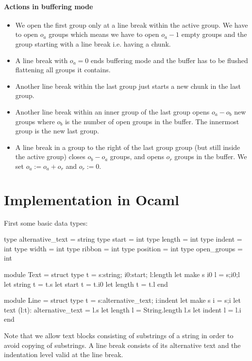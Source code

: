 \documentclass[12pt]{article}
\begin{document}
\paragraph{Actions in buffering mode}
\begin{itemize}
\item We open the first group only at a line break within the active group. We
  have to open $o_a$ groups which means we have to open $o_a - 1$ empty groups
  and the group starting with a line break i.e. having a chunk.

\item A line break with $o_a = 0$ ends buffering mode and the buffer has to be
  flushed flattening all groups it contains.

\item Another line break within the last group just starts a new chunk in the
   last group.

 \item Another line break within an inner group of the last group opens
   $o_a - o_b$ new groups where $o_b$ is the number of open groups in the
   buffer. The innermost group is the new last group.


\item A line break in a group to the right of the last group group (but still
  inside the active group) closes $o_b - o_a$ groups, and opens $o_r$ groups
  in the buffer. We set $o_a := o_a + o_r$ and $o_r := 0$.
\end{itemize}



\section{Implementation in Ocaml}

First some basic data types:
\begin{ocaml}
  type alternative_text = string
  type start = int
  type length = int
  type indent = int
  type width  = int
  type ribbon = int
  type position = int
  type open_groups = int

  module Text =
    struct
      type t = {s:string; i0:start; l:length}
      let make s i0 l = {s;i0;l}
      let string t = t.s
      let start t = t.i0
      let length t = t.l
    end

  module Line =
    struct
      type t = {s:alternative_text; i:indent}
      let make s i = {s;i}
      let text (l:t): alternative_text = l.s
      let length l = String.length l.s
      let indent l = l.i
    end
\end{ocaml}
%
Note that we allow text blocks consisting of substrings of a string in order
to avoid copying of substrings. A line break consists of its alternative text
and the indentation level valid at the line break.
\end{document}
